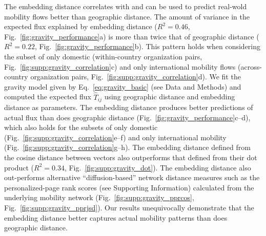 \documentclass[12pt]{article} %
\def\SI{Supporting Information}
\begin{document}
The embedding distance correlates with and can be used to predict real-wold mobility flows better than geographic distance. 
The amount of variance in the expected flux explained by embedding distance ($R^{2} = 0.46$, Fig.~\ref{fig:gravity_performance}a) is more than twice that of geographic distance ($R^{2} = 0.22$, Fig.~\ref{fig:gravity_performance}b).
This pattern holds when considering the subset of only domestic (within-country organization pairs, Fig.~\ref{fig:supp:gravity_correlation}c) and only international mobility flows (across-country organization pairs, Fig.~\ref{fig:supp:gravity_correlation}d).
We fit the gravity model given by Eq.~\ref{eq:gravity_basic} (see Data and Methods) and computed the expected flux  $\hat{T}_{ij}$ using geographic distance and embedding distance as parameters.
The embedding distance produces better predictions of actual flux than does geographic distance (Fig.~\ref{fig:gravity_performance}c--d), which also holds for the subsets of only domestic (Fig.~\ref{fig:supp:gravity_correlation}e--f) and only international mobility (Fig.~\ref{fig:supp:gravity_correlation}g--h).
The embedding distance defined from the cosine distance between vectors also outperforms that defined from their dot product ($R^{2} = 0.34$, Fig.~\ref{fig:supp:gravity_dot}).
The embedding distance also out-performs alternative ``diffusion-based'' network distance measures such as the personalized-page rank scores (see \SI) calculated from the underlying mobility network (Fig.~\ref{fig:supp:gravity_pprcos}, Fig.~\ref{fig:supp:gravity_pprjsd}).
Our results unequivocally demonstrate that the embedding distance better captures actual mobility patterns than does geographic distance.
\end{document}
